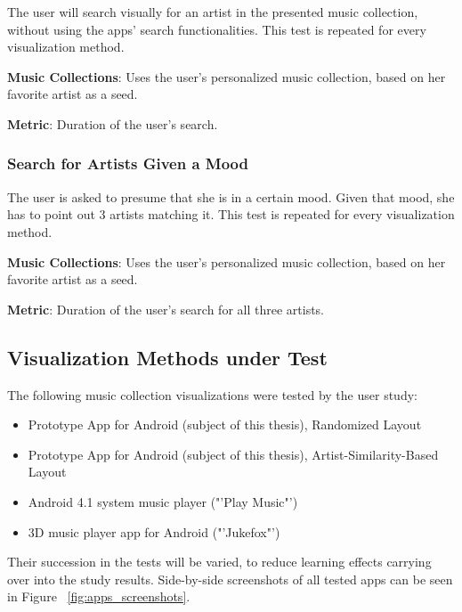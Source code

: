 The user will search visually for an artist in the presented music collection, without using the apps' search functionalities. This test is repeated for every visualization method.

\textbf{Music Collections}: Uses the user's personalized music collection, based on her favorite artist as a seed.

\textbf{Metric}: Duration of the user's search.

	
\subsubsection{Search for Artists Given a Mood}
	
The user is asked to presume that she is in a certain mood. Given that mood, she has to point out 3 artists matching it. This test is repeated for every visualization method.
	
\textbf{Music Collections}: Uses the user's personalized music collection, based on her favorite artist as a seed.
	
\textbf{Metric}: Duration of the user's search for all three artists.



\subsection{Visualization Methods under Test}

The following music collection visualizations were tested by the user study:

\begin{itemize}
	\item Prototype App for Android (subject of this thesis), Randomized Layout
	\item Prototype App for Android (subject of this thesis), Artist-Similarity-Based Layout
	\item Android 4.1 system music player ("'Play Music"')
	\item 3D music player app for Android ("'Jukefox"')
\end{itemize}

Their succession in the tests will be varied, to reduce learning effects carrying over into the study results. Side-by-side screenshots of all tested apps can be seen in Figure ~\ref{fig:apps_screenshots}.


